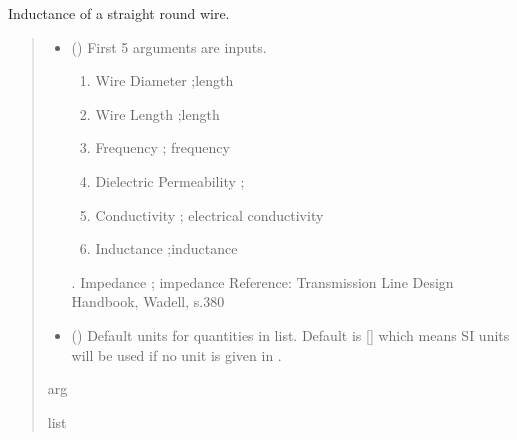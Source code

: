 \documentclass[letterpaper,10pt,english]{sphinxmanual}
\begin{document}

\begin{fulllineitems}
\label{\detokenize{components:components.L_StraightRoundWire}}
\pysigstartsignatures
{}
\pysigstopsignatures
\sphinxAtStartPar
Inductance of a straight round wire.
\begin{quote}\begin{description}
\begin{itemize}
\item {}
\sphinxAtStartPar
{} () \textendash{}
\sphinxAtStartPar
First 5 arguments are inputs.
\begin{enumerate}
%
\item {}
\sphinxAtStartPar
Wire Diameter ;length

\item {}
\sphinxAtStartPar
Wire Length ;length

\item {}
\sphinxAtStartPar
Frequency ; frequency

\item {}
\sphinxAtStartPar
Dielectric Permeability  ;

\item {}
\sphinxAtStartPar
Conductivity ; electrical conductivity

\item {}
\sphinxAtStartPar
Inductance ;inductance

\end{enumerate}

. Impedance ; impedance
Reference:  Transmission Line Design Handbook, Wadell, s.380


\item {}
\sphinxAtStartPar
{} (\sphinxstyleliteralemphasis{\sphinxupquote{, }}) \textendash{} Default units for quantities in  list. Default is {[}{]} which means SI units will be used if no unit is given in .

\end{itemize}

\sphinxAtStartPar
arg

\sphinxAtStartPar
list

\end{description}\end{quote}

\end{fulllineitems}
\end{document}
